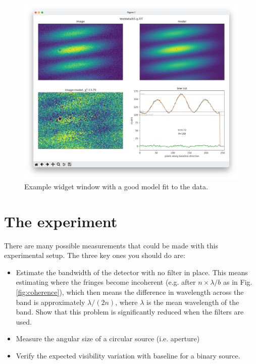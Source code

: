 \documentclass[11pt]{article}
\begin{document}
\begin{figure}
    \centering
    \includegraphics[width=1\textwidth]{widget2.png}
    \caption{Example widget window with a good model fit to the data.}
    \label{fig:widget2}
\end{figure}

\clearpage
\section{The experiment}

There are many possible measurements that could be made with this experimental setup. The three key ones you should do are:
\begin{itemize}
    \item Estimate the bandwidth of the detector with no filter in place. This means estimating where the fringes become incoherent (e.g. after $n \times \lambda/b$ as in Fig. \ref{fig:coherence}), which then means the difference in wavelength across the band is approximately $\lambda/(2n)$, where $\lambda$ is the mean wavelength of the band. Show that this problem is significantly reduced when the filters are used.
    \item Measure the angular size of a circular source (i.e. aperture)
    \item Verify the expected visibility variation with baseline for a binary source. 
\end{itemize}
\end{document}
